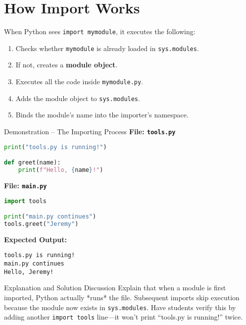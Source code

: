 \documentclass[12pt]{article}
\begin{document}
\section{How Import Works}

When Python sees \texttt{import mymodule}, it executes the following:

\begin{enumerate}
  \item Checks whether \texttt{mymodule} is already loaded in \texttt{sys.modules}.  
  \item If not, creates a \textbf{module object}.  
  \item Executes all the code inside \texttt{mymodule.py}.  
  \item Adds the module object to \texttt{sys.modules}.  
  \item Binds the module’s name into the importer’s namespace.
\end{enumerate}

\begin{activitybox}{Demonstration – The Importing Process}
\textbf{File: \texttt{tools.py}}
\begin{lstlisting}[language=Python]
print("tools.py is running!")

def greet(name):
    print(f"Hello, {name}!")
\end{lstlisting}

\textbf{File: \texttt{main.py}}
\begin{lstlisting}[language=Python]
import tools

print("main.py continues")
tools.greet("Jeremy")
\end{lstlisting}

\textbf{Expected Output:}
\begin{lstlisting}
tools.py is running!
main.py continues
Hello, Jeremy!
\end{lstlisting}
\end{activitybox}

\begin{teacherbox}{Explanation and Solution Discussion}
Explain that when a module is first imported, Python actually *runs* the file.  
Subsequent imports skip execution because the module now exists in \texttt{sys.modules}.  
Have students verify this by adding another \texttt{import tools} line—it won’t print “tools.py is running!” twice.
\end{teacherbox}

\end{document}
